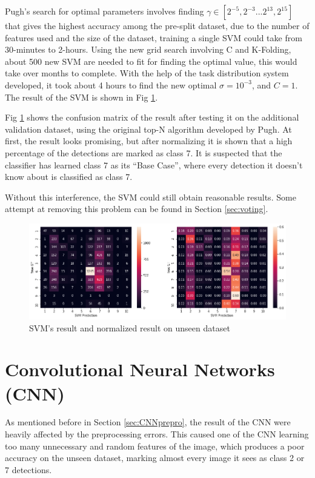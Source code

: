 \documentclass[bsc,frontabs,twoside,fullspacing,parskip,deptreport]{infthesis}
\begin{document}
Pugh's search for optimal parameters involves finding \(\gamma\in[2^{-5},2^{-3}...2^{13},2^{15}]\) that gives the highest accuracy among the pre-split dataset, due to the number of features used and the size of the dataset, training a single SVM could take from 30-minutes to 2-hours. Using the new grid search involving C and K-Folding, about 500 new SVM are needed to fit for finding the optimal value, this would take over months to complete.
With the help of the task distribution system developed, it took about 4 hours to find the
new optimal \(\sigma = 10^{-3}\), and \(C = 1\).
The result of the SVM is shown in Fig \ref{fig:svmacc}.

Fig \ref{fig:svmacc} shows the confusion matrix of the result after testing it on the additional validation dataset, using the original top-N algorithm developed by Pugh\cite{Pugh}. 
At first, the result looks promising, but after normalizing it is shown that a high percentage of the detections are marked as class 7.
It is suspected that the classifier has learned class 7 as its ``Base Case'', where every detection it doesn't know about is classified as class 7.

Without this interference, the SVM could still obtain reasonable results.
Some attempt at removing this problem can be found in Section \ref{sec:voting}.

\begin{figure}[h]
\centering
    \includegraphics[scale=0.44]{graph/svmresult.png}
    \caption{SVM's result and normalized result on unseen dataset}
    \label{fig:svmacc}
\end{figure} 

\section{Convolutional Neural Networks (CNN)}
\label{sec:cnn}

As mentioned before in Section \ref{sec:CNNprepro}, the result of the CNN were heavily affected by the preprocessing errors. This caused one of the CNN learning too many unnecessary and random features of the image, which produces a poor accuracy on the unseen dataset, marking almost every image it sees as class 2 or 7 detections. 
\end{document}
